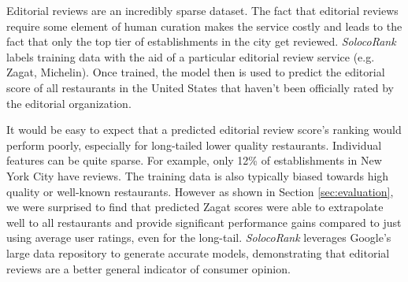 Editorial reviews are an incredibly sparse dataset.
The fact that editorial reviews require some element of human curation makes the service costly
and leads to the fact that only the top tier of establishments in the city get reviewed.
\emph{SolocoRank} labels training data with the aid of a particular editorial
review service (e.g. Zagat, Michelin).
Once trained, the model then is used to predict the editorial score of all restaurants in the United States
that haven't been officially rated by the editorial organization.

It would be easy to expect that a predicted editorial review score's ranking
would perform poorly, especially for long-tailed lower quality restaurants.
Individual features can be quite sparse.
For example, only 12\% of establishments in New York City have reviews.
The training data is also typically biased towards high quality or well-known
restaurants. 
However as shown in Section \ref{sec:evaluation},
we were surprised to find that predicted Zagat scores were able to
extrapolate well to all restaurants and
provide significant performance gains compared to just using average user ratings, even for the long-tail.
\emph{SolocoRank} leverages Google's large data repository to generate accurate models,
demonstrating that editorial reviews are a better general indicator
of consumer opinion.

